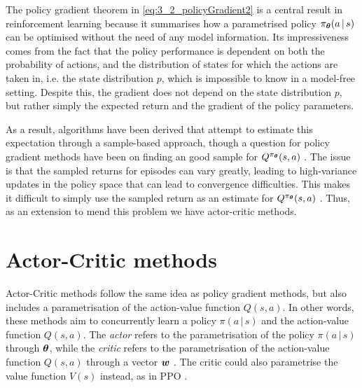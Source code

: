 The policy gradient theorem in \eqref{eq:3_2_policyGradient2} is a central result in reinforcement learning because it summarises how a parametrised policy $\pi_{\boldsymbol{\theta}} (a \, | \, s)$ can be optimised without the need of any model information. Its impressiveness comes from the fact that the policy performance is dependent on both the probability of actions, and the distribution of states for which the actions are taken in, i.e. the state distribution $p$, which is impossible to know in a model-free setting. Despite this, the gradient does not depend on the state distribution $p$, but rather simply the expected return and the gradient of the policy parameters.

As a result, algorithms have been derived that attempt to estimate this expectation through a sample-based approach, though a question for policy gradient methods have been on finding an good sample for $Q^{\pi_{\boldsymbol{\theta}}} (s,a)$ \cite{DPG}. The issue is that the sampled returns for episodes can vary greatly, leading to high-variance updates in the policy space that can lead to convergence difficulties. This makes it difficult to simply use the sampled return as an estimate for $Q^{\pi_{\boldsymbol{\theta}}}(s,a)$ \cite{suttonAndBartoBook}. Thus, as an extension to mend this problem we have actor-critic methods.


\section{Actor-Critic methods}
\label{sec:3_3_actor-critic}

Actor-Critic methods follow the same idea as policy gradient methods, but also includes a parametrisation of the action-value function $Q(s,a)$. In other words, these methods aim to concurrently learn a policy $\pi(a\,|\,s)$ and the action-value function $Q(s,a)$. 
The \textit{actor} refers to the parametrisation of the policy $\pi(a\,|\,s)$ through $\boldsymbol{\theta}$, while the \textit{critic} refers to the parametrisation of the action-value function $Q(s,a)$ through a vector $\boldsymbol{w}$ \cite{suttonAndBartoBook}. The critic could also parametrise the value function $V(s)$ instead, as in PPO \cite{PPO}.

